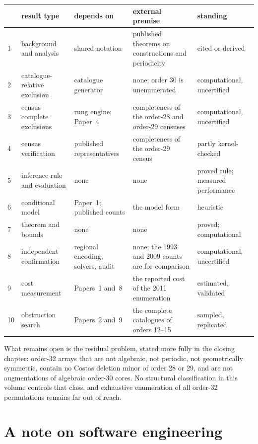 \begin{center}
\small
\begin{tabular}{@{}p{}>{\raggedright\arraybackslash}p{}>{\raggedright\arraybackslash}p{}>{\raggedright\arraybackslash}p{}>{\raggedright\arraybackslash}p{}@{}}
\toprule
& result type & depends on & external premise & standing \\
\midrule
1 & background and analysis & shared notation & published theorems on constructions and periodicity & cited or derived \\
2 & catalogue-relative exclusion & catalogue generator & none; order 30 is unenumerated & computational, uncertified \\
3 & census-complete exclusions & rung engine; Paper~4 & completeness of the order-28 and order-29 censuses & computational, uncertified \\
4 & census verification & published representatives & completeness of the order-29 census & partly kernel-checked \\
5 & inference rule and evaluation & none & none & proved rule; measured performance \\
6 & conditional model & Paper~1; published counts & the model form & heuristic \\
7 & theorem and bounds & none & none & proved; computational \\
8 & independent confirmation & regional encoding, solvers, audit & none; the 1993 and 2009 counts are for comparison & computational, uncertified \\
9 & cost measurement & Papers~1 and~8 & the reported cost of the 2011 enumeration & estimated, validated \\
10 & obstruction search & Papers~2 and~9 & the complete catalogues of orders 12--15 & sampled, replicated \\
\bottomrule
\end{tabular}
\end{center}

What remains open is the residual problem, stated more fully in the closing chapter: order-32 arrays that are not algebraic, not periodic,
not geometrically symmetric, contain no Costas deletion minor of order 28 or 29, and are not
augmentations of algebraic order-30 cores. No structural classification in this volume controls
that class, and exhaustive enumeration of all order-32 permutations remains far out of reach.


\chapter*{A note on software engineering}

